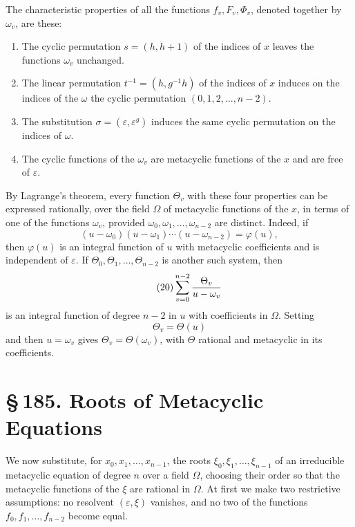 \documentclass[11pt]{article}
\providecommand{\sect}[2]{\section*{\S\,#1. #2}}
\begin{document}
The characteristic properties of all the functions $f_v,F_v,\Phi_v$, denoted together by $\omega_v$, are these:
\begin{enumerate}[label=\alph*)]
\item The cyclic permutation $s=(h,h+1)$ of the indices of $x$ leaves the functions $\omega_v$ unchanged.
\item The linear permutation $t^{-1}=(h,g^{-1}h)$ of the indices of $x$ induces on the indices of the $\omega$ the cyclic permutation $(0,1,2,\ldots,n-2)$.
\item The substitution $\sigma=(\varepsilon,\varepsilon^g)$ induces the same cyclic permutation on the indices of $\omega$.
\item The cyclic functions of the $\omega_v$ are metacyclic functions of the $x$ and are free of $\varepsilon$.
\end{enumerate}

By Lagrange's theorem, every function $\Theta_v$ with these four properties can be expressed rationally, over the field $\Omega$ of metacyclic functions of the $x$, in terms of one of the functions $\omega_v$, provided $\omega_0,\omega_1,\ldots,\omega_{n-2}$ are distinct. Indeed, if
\begin{equation}\tag{19}
  (u-\omega_0)(u-\omega_1)\cdots(u-\omega_{n-2})=\varphi(u),
\end{equation}
then $\varphi(u)$ is an integral function of $u$ with metacyclic coefficients and is independent of $\varepsilon$. If $\Theta_0,\Theta_1,\ldots,\Theta_{n-2}$ is another such system, then
\begin{equation}\tag{20}
  \sum_{v=0}^{n-2}{\Theta_v\over u-\omega_v}
\end{equation}
is an integral function of degree $n-2$ in $u$ with coefficients in $\Omega$. Setting
\begin{equation}\tag{21}
  \Theta_v=\Theta(u)
\end{equation}
and then $u=\omega_v$ gives $\Theta_v=\Theta(\omega_v)$, with $\Theta$ rational and metacyclic in its coefficients.

\sect{185}{Roots of Metacyclic Equations}

We now substitute, for $x_0,x_1,\ldots,x_{n-1}$, the roots $\xi_0,\xi_1,\ldots,\xi_{n-1}$ of an irreducible metacyclic equation of degree $n$ over a field $\Omega$, choosing their order so that the metacyclic functions of the $\xi$ are rational in $\Omega$. At first we make two restrictive assumptions: no resolvent $(\varepsilon,\xi)$ vanishes, and no two of the functions $f_0,f_1,\ldots,f_{n-2}$ become equal.
\end{document}
